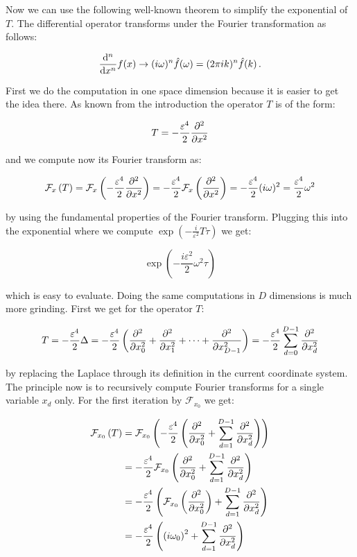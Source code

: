 Now we can use the following well-known theorem to simplify the exponential of $T$.
The differential operator transforms under the Fourier transformation as follows:

\begin{equation*}
  \diff[n]{}{x} f(x) \rightarrow (i\omega)^n \hat{f}(\omega) = (2\pi i k)^n \hat{f}(k) \,.
\end{equation*}

First we do the computation in one space dimension because it is easier
to get the idea there. As known from the introduction the operator $T$
is of the form:

\begin{equation}
  T = -\frac{\varepsilon^4}{2} \pdiff[2]{}{x}
\end{equation}

and we compute now its Fourier transform as:

\begin{align*}
  \mathcal{F}_x\left(T\right)
  = \mathcal{F}_x\left(-\frac{\varepsilon^4}{2} \pdiff[2]{}{x}\right)
  = -\frac{\varepsilon^4}{2} \mathcal{F}_x\left(\pdiff[2]{}{x}\right)
  = -\frac{\varepsilon^4}{2} (i\omega)^2
  = \frac{\varepsilon^4}{2} \omega^2
\end{align*}

by using the fundamental properties of the Fourier transform. Plugging this into
the exponential where we compute $\exp\left(-\frac{i}{\varepsilon^2}T\tau\right)$
we get:

\begin{equation} \label{eq:expt_1D}
  \exp\left(-\frac{i\varepsilon^2}{2} \omega^2\tau\right)
\end{equation}

which is easy to evaluate. Doing the same computations in $D$ dimensions is
much more grinding. First we get for the operator $T$:

\begin{equation}
  T = -\frac{\varepsilon^4}{2} \Delta
    = -\frac{\varepsilon^4}{2} \left(\pdiff[2]{}{x_0} + \pdiff[2]{}{x_1} + \cdots + \pdiff[2]{}{x_{D-1}}\right)
    = -\frac{\varepsilon^4}{2} \sum_{d=0}^{D-1} \pdiff[2]{}{x_d}
\end{equation}

by replacing the Laplace through its definition in the current coordinate system.
The principle now is to recursively compute Fourier transforms for a single variable
$x_d$ only. For the first iteration by $\mathcal{F}_{x_0}$ we get:

\begin{align*}
  \mathcal{F}_{x_0}\left(T\right)
  & = \mathcal{F}_{x_0}\left( -\frac{\varepsilon^4}{2} \left(\pdiff[2]{}{x_0} + \sum_{d=1}^{D-1} \pdiff[2]{}{x_d}\right) \right) \\
  & = -\frac{\varepsilon^4}{2} \mathcal{F}_{x_0}\left(\pdiff[2]{}{x_0} + \sum_{d=1}^{D-1} \pdiff[2]{}{x_d}\right) \\
  & = -\frac{\varepsilon^4}{2} \left(\mathcal{F}_{x_0}\left(\pdiff[2]{}{x_0}\right) + \sum_{d=1}^{D-1} \pdiff[2]{}{x_d}\right) \\
  & = -\frac{\varepsilon^4}{2} \left(\left(i\omega_0\right)^2 + \sum_{d=1}^{D-1} \pdiff[2]{}{x_d}\right)
\end{align*}

